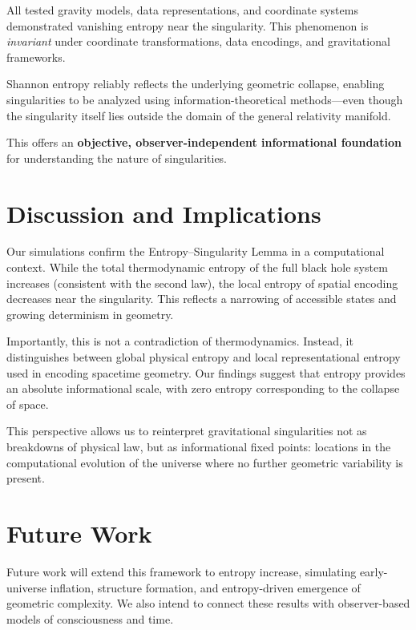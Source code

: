 \documentclass[11pt]{article}
\begin{document}
All tested gravity models, data representations, and coordinate systems demonstrated vanishing entropy near the singularity. This phenomenon is \textit{invariant} under coordinate transformations, data encodings, and gravitational frameworks.

Shannon entropy reliably reflects the underlying geometric collapse, enabling singularities to be analyzed using information-theoretical methods---even though the singularity itself lies outside the domain of the general relativity manifold.

This offers an \textbf{objective, observer-independent informational foundation} for understanding the nature of singularities.


\section{Discussion and Implications}

Our simulations confirm the Entropy--Singularity Lemma in a computational context. While the total thermodynamic entropy of the full black hole system increases (consistent with the second law), the local entropy of spatial encoding decreases near the singularity. This reflects a narrowing of accessible states and growing determinism in geometry.

Importantly, this is not a contradiction of thermodynamics. Instead, it distinguishes between global physical entropy and local representational entropy used in encoding spacetime geometry. Our findings suggest that entropy provides an absolute informational scale, with zero entropy corresponding to the collapse of space.

This perspective allows us to reinterpret gravitational singularities not as breakdowns of physical law, but as informational fixed points: locations in the computational evolution of the universe where no further geometric variability is present.


\section{Future Work}


Future work will extend this framework to entropy increase, simulating early-universe inflation, structure formation, and entropy-driven emergence of geometric complexity. We also intend to connect these results with observer-based models of consciousness and time.

\appendix
\end{document}

